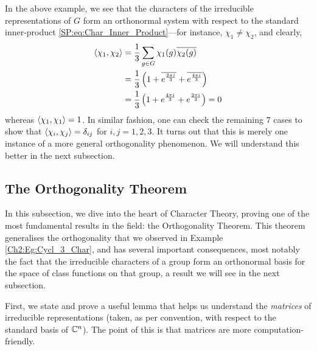 In the above example, we see that the characters of the irreducible representations of $G$ form an orthonormal system with respect to the standard inner-product \eqref{SP:eq:Char_Inner_Product}---for instance, $\chi_1 \neq \chi_2$, and clearly,
\begin{align*}
    \left\langle \chi_1, \chi_2 \right\rangle &= \frac{1}{3} \sum_{g \in G} \chi_1(g) \overline{\chi_2(g)} \\
    &= \frac{1}{3} \left( 1 + \overline{e^{\frac{2\pi i}{3}}} + \overline{e^{\frac{4\pi i}{3}}} \right) \\
    &= \frac{1}{3} \left( 1 + e^{\frac{4\pi i}{3}} + e^{\frac{2\pi i}{3}} \right) = 0
\end{align*}
whereas $\left\langle \chi_1, \chi_1 \right\rangle = 1$. In similar fashion, one can check the remaining $7$ cases to show that $\left\langle \chi_i, \chi_j \right\rangle = \delta_{ij}$ for $i,j = 1,2,3$. It turns out that this is merely one instance of a more general orthogonality phenomenon. We will understand this better in the next subsection.

\subsection{The Orthogonality Theorem}

In this subsection, we dive into the heart of Character Theory, proving one of the most fundamental results in the field: the Orthogonality Theorem. This theorem generalises the orthogonality that we observed in Example \ref{Ch2:Eg:Cycl_3_Char}, and has several important consequences, most notably the fact that the irreducible characters of a group form an orthonormal basis for the space of class functions on that group, a result we will see in the next subsection.

First, we state and prove a useful lemma that helps us understand the \textit{matrices} of irreducible representations (taken, as per convention, with respect to the standard basis of $\mathbb{C}^n$). The point of this is that matrices are more computation-friendly.

